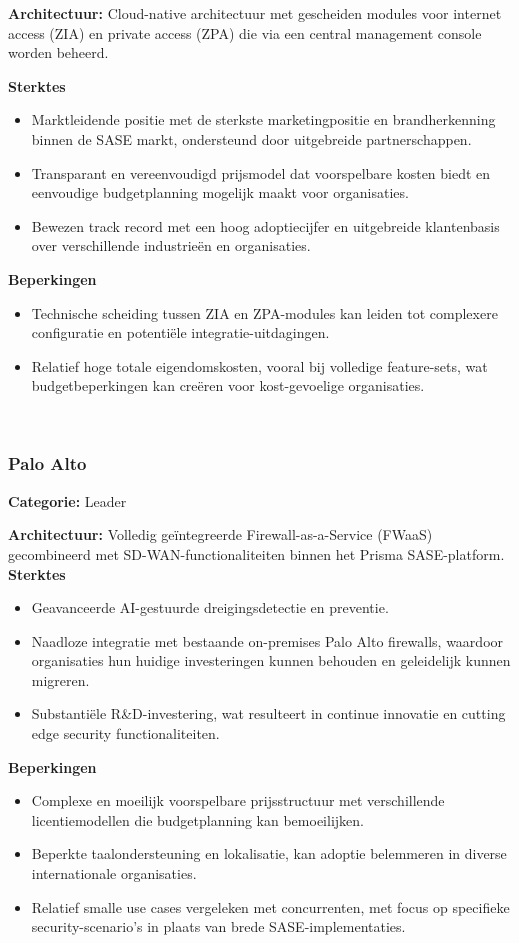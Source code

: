 \textbf{Architectuur:} Cloud-native architectuur met gescheiden modules voor internet access (ZIA) en private access (ZPA) die via een central management console worden beheerd.

\textbf{Sterktes}
\begin{itemize}
    \item Marktleidende positie met de sterkste marketingpositie en brandherkenning binnen de SASE markt, ondersteund door uitgebreide partnerschappen.
    \item Transparant en vereenvoudigd prijsmodel dat voorspelbare kosten biedt en eenvoudige budgetplanning mogelijk maakt voor organisaties.
    \item Bewezen track record met een hoog adoptiecijfer en uitgebreide klantenbasis over verschillende industrieën en organisaties.
\end{itemize}

\textbf{Beperkingen}
\begin{itemize}
    \item Technische scheiding tussen ZIA en ZPA-modules kan leiden tot complexere configuratie en potentiële integratie-uitdagingen.
    \item Relatief hoge totale eigendomskosten, vooral bij volledige feature-sets, wat budgetbeperkingen kan creëren voor kost-gevoelige organisaties.
\end{itemize}
~\autocite{Gartner2025}

\subsubsection{Palo Alto}
\textbf{Categorie:} Leader

\textbf{Architectuur:} Volledig geïntegreerde Firewall-as-a-Service (FWaaS) gecombineerd met SD-WAN-functionaliteiten binnen het Prisma SASE-platform.
\textbf{Sterktes}
\begin{itemize}
    \item Geavanceerde AI-gestuurde dreigingsdetectie en preventie.
    \item Naadloze integratie met bestaande on-premises Palo Alto firewalls, waardoor organisaties hun huidige investeringen kunnen behouden en geleidelijk kunnen migreren.
    \item Substantiële R\&D-investering, wat resulteert in continue innovatie en cutting edge security functionaliteiten.
\end{itemize}

\textbf{Beperkingen}
\begin{itemize}
    \item Complexe en moeilijk voorspelbare prijsstructuur met verschillende licentiemodellen die budgetplanning kan bemoeilijken.
    \item Beperkte taalondersteuning en lokalisatie, kan adoptie belemmeren in diverse internationale organisaties.
    \item Relatief smalle use cases vergeleken met concurrenten, met focus op specifieke security-scenario's in plaats van brede SASE-implementaties.
\end{itemize}
~\autocite{Gartner2025}


